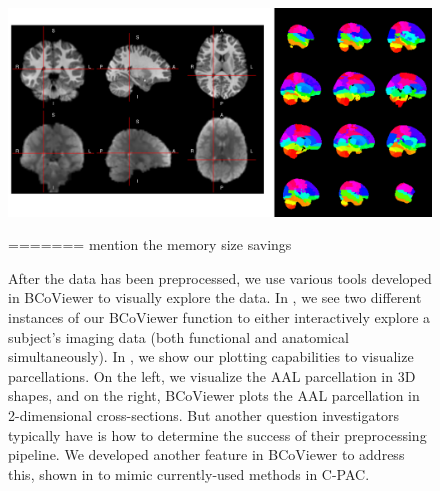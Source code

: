 \documentclass{nature}
\begin{document}
{\begin{figure}[tb]
\centering
\includegraphics[width=400pt]{fig/brainconductor/BCoViewer.png}
\caption{(Left) An interactive imaging viewer in BCoViewer designed in R to mimic fslview. (Right) A parcellation plotter in BCoViewer. Each color represents a different parcel.}
\label{fig:features}
=======
{\color{red}mention the memory size savings}

After the data has been preprocessed, we use various tools developed in
BCoViewer
to visually explore the data. In , we see two different
instances
of our BCoViewer function to either interactively explore a subject's imaging
data (both
functional and anatomical simultaneously). 
In , we show our plotting capabilities to visualize parcellations.
On the left, we visualize the AAL parcellation in 3D shapes, and on the right, BCoViewer plots the AAL
parcellation in 2-dimensional cross-sections. But another question investigators typically
have is 
how to determine the success of their preprocessing pipeline. We developed
another feature
in BCoViewer to address this, shown in  to mimic
currently-used methods
in C-PAC.


\begin{figure}
\centering
\begin{subfigure}{.5\textwidth}
  \centering
 

\end{subfigure}
\end{figure}
\end{figure}}
\end{document}
